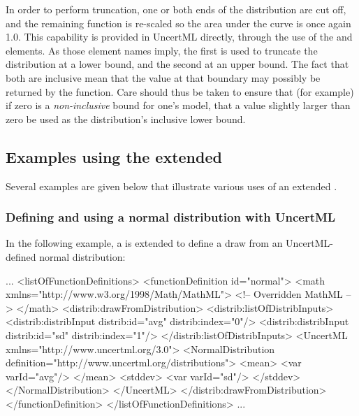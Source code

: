 \documentclass[draftspec]{sbmlpkgspec}
\begin{document}
In order to perform truncation, one or both ends of the distribution are cut off, and the remaining function is re-scaled so the area under the curve is once again 1.0.  This capability is provided in UncertML directly, through the use of the  and  elements.  As those element names imply, the first is used to truncate the distribution at a lower bound, and the second at an upper bound.  The fact that both are inclusive mean that the value at that boundary may possibly be returned by the function.  Care should thus be taken to ensure that (for example) if zero is a \emph{non-inclusive} bound for one's model, that a value slightly larger than zero be used as the distribution's inclusive lower bound.


\subsection{Examples using the extended \FunctionDefinition}
\label{sec:fd-examples}

Several examples are given below that illustrate various uses of an extended \FunctionDefinition.

\subsubsection{Defining and using a normal distribution with UncertML}
In the following example, a \FunctionDefinition is extended to define a draw from an UncertML-defined normal distribution:

\begin{example}
...
  <listOfFunctionDefinitions>
    <functionDefinition id="normal">
      <math xmlns="http://www.w3.org/1998/Math/MathML">
        <!-- Overridden MathML -->
      </math>
      <distrib:drawFromDistribution>
         <distrib:listOfDistribInputs>
           <distrib:distribInput distrib:id="avg" distrib:index="0"/>
           <distrib:distribInput distrib:id="sd" distrib:index="1"/>
         </distrib:listOfDistribInputs>
         <UncertML xmlns="http://www.uncertml.org/3.0">
           <NormalDistribution definition="http://www.uncertml.org/distributions">
             <mean>
               <var varId="avg"/>
             </mean>
             <stddev>
               <var varId="sd"/>
             </stddev>
           </NormalDistribution>
         </UncertML>
      </distrib:drawFromDistribution>
    </functionDefinition>
  </listOfFunctionDefinitions>
...
\end{example}
\end{document}

